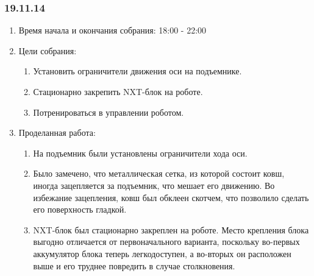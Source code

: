 \subsubsection{19.11.14}

\begin{enumerate}
	\item Время начала и окончания собрания:
	18:00 - 22:00
	\item Цели собрания:
	\begin{enumerate}
	  \item Установить ограничители движения оси на подъемнике.
	  
	  \item Стационарно закрепить NXT-блок на роботе.
	  
	  \item Потренироваться в управлении роботом.
	  
    \end{enumerate}
	\item Проделанная работа:
	\begin{enumerate}
	  \item На подъемник были установлены ограничители хода оси.
	  

      \item Было замечено, что металлическая сетка, из которой состоит ковш, иногда зацепляется за подъемник, что мешает его движению. Во избежание зацепления, ковш был обклеен скотчем, что позволило сделать его поверхность гладкой.
      
      \item NXT-блок был стационарно закреплен на роботе. Место крепления блока выгодно отличается от первоначального варианта, поскольку во-первых аккумулятор блока теперь легкодоступен, а во-вторых он расположен выше и его труднее повредить в случае столкновения.
      

\end{enumerate}
\end{enumerate}
